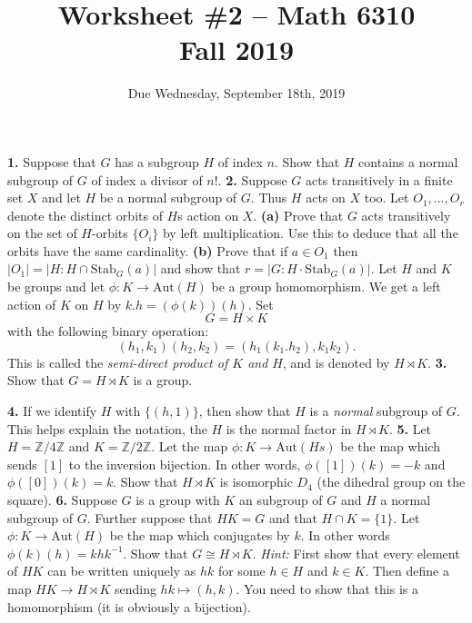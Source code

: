 \documentclass[11pt]{amsart}
\theoremstyle{theorem}
\renewcommand{\to}[1][]{\xrightarrow{\ #1\ }}
\newcommand{\bZ}{\mathbb{Z}}
\newcommand{\Stab}{\mathrm{Stab}}
\begin{document}
\title{Worksheet \#2 -- Math 6310\\Fall 2019}
\author{Due Wednesday, September 18th, 2019}
\maketitle

\noindent
{\bf 1.}  Suppose that $G$ has a subgroup $H$ of index $n$.  Show that $H$ contains a normal subgroup of $G$ of index a divisor of $n!$.
\newpage
\noindent
{\bf 2.}  Suppose $G$ acts transitively in a finite set $X$ and let $H$ be a normal subgroup of $G$.  Thus $H$ acts on $X$ too.  Let $O_1, \dots, O_r$ denote the distinct orbits of $H$s action on $X$.
\vskip 9pt
\noindent
{\bf (a)}  Prove that $G$ acts transitively on the set of $H$-orbits $\{ O_i \}$ by left multiplication.  Use this to deduce that all the orbits have the same cardinality.  
\vskip 300pt
\noindent
{\bf (b)}  Prove that if $a \in O_1$ then $|O_1| = |H : H \cap \Stab_G(a)|$ and show that $r = |G : H\cdot \Stab_G(a)|$.
\newpage
\noindent
Let $H$ and $K$ be groups and let $\phi : K \to \text{Aut}(H)$ be a group homomorphism.  We get a left action of $K$ on $H$ by $k.h = (\phi(k))(h)$.
Set
\[
G = H \times K
\]
with the following binary operation:
\[
(h_1, k_1)(h_2, k_2) = (h_1 (k_1.h_2), k_1 k_2).
\]
This is called the \emph{semi-direct product of $K$ and $H$}, and is denoted by $H \rtimes K$.
\vskip 9pt
\noindent
{\bf 3.}  Show that $G = H \rtimes K$ is a group.

\newpage
\noindent
{\bf 4.}  If we identify $H$ with $\{ (h, 1) \}$, then show that $H$ is a \emph{normal} subgroup of $G$.  This helps explain the notation, the $H$ is the normal factor in $H \rtimes K$.
\newpage
\noindent
{\bf 5.}  Let $H = \bZ/4 \bZ$ and $K = \bZ/2\bZ$.  Let the map $\phi : K \to \text{Aut}(Hs)$ be the map which sends $[1]$ to the inversion bijection.  In other words, $\phi([1])(k) = -k$ and $\phi([0])(k) = k$.
Show that $H \rtimes K$ is isomorphic $D_{4}$ (the dihedral group on the square).
\newpage
\noindent
{\bf 6.}  Suppose $G$ is a group with $K$ an subgroup of $G$ and $H$ a normal subgroup of $G$.  Further suppose that $HK = G$ and that $H \cap K = \{ 1 \}$.  Let $\phi : K \to \text{Aut}(H)$ be the map which conjugates by $k$.  In other words $\phi(k)(h) = khk^{-1}$.  Show that $G \cong H \rtimes K$.
\vskip 3pt
\emph{Hint:} First show that every element of $HK$ can be written uniquely as $hk$ for some $h \in H$ and $k \in K$.  Then define a map $HK \to H \rtimes K$ sending $hk \mapsto (h, k)$.  You need to show that this is a homomorphism (it is obviously a bijection).
\end{document}
